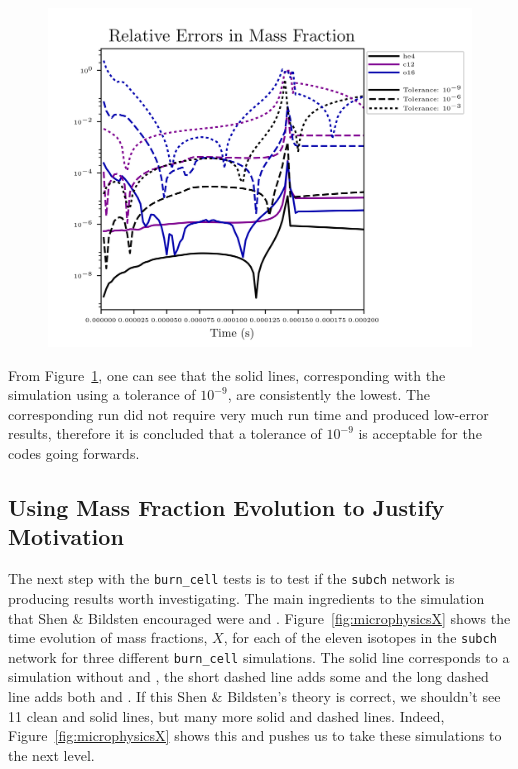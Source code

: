 \documentclass[11pt, oneside]{article}   	%
\begin{document}
      \begin{figure}
        \centering
        \includegraphics[width=5in]{images/react_aprox13_test13_ureca_tol-rel_xn1.png}
        \caption{}
        \label{fig:relativeerror}
      \end{figure}  
  
      From Figure~\ref{fig:relativeerror}, one can see that the solid lines, corresponding with the simulation using a tolerance of $10^{-9}$, are consistently the lowest. The corresponding run did not require very much run time and produced low-error results, therefore it is concluded that a tolerance of $10^{-9}$ is acceptable for the codes going forwards. 
  
    \subsection{Using Mass Fraction Evolution to Justify Motivation}
    
      The next step with the {\tt burn\_cell} tests is to test if the {\tt subch} network is producing results worth investigating. The main ingredients to the simulation that Shen \& Bildsten encouraged were  and . %
      Figure~\ref{fig:microphysicsX} shows the time evolution of mass fractions, $X$, for each of the eleven isotopes in the {\tt subch} network for three different {\tt burn\_cell} simulations. The solid line corresponds to a simulation without  and , the short dashed line adds some  and the long dashed line adds both  and . If this Shen \& Bildsten's theory is correct, we shouldn't see 11 clean and solid lines, but many more solid and dashed lines. Indeed, Figure~\ref{fig:microphysicsX} shows this and pushes us to take these simulations to the next level.
      
\end{document}
